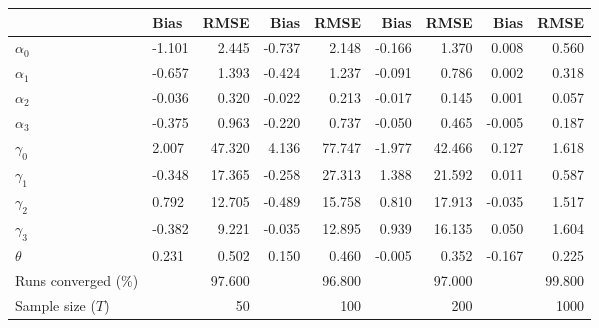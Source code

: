 
\begin{tabular}[t]{llrrrrrrr}
\toprule
  & Bias & RMSE & Bias & RMSE & Bias & RMSE & Bias & RMSE\\
\midrule
$\alpha_{0}$ & -1.101 & 2.445 & -0.737 & 2.148 & -0.166 & 1.370 & 0.008 & 0.560\\
$\alpha_{1}$ & -0.657 & 1.393 & -0.424 & 1.237 & -0.091 & 0.786 & 0.002 & 0.318\\
$\alpha_{2}$ & -0.036 & 0.320 & -0.022 & 0.213 & -0.017 & 0.145 & 0.001 & 0.057\\
$\alpha_{3}$ & -0.375 & 0.963 & -0.220 & 0.737 & -0.050 & 0.465 & -0.005 & 0.187\\
$\gamma_{0}$ & 2.007 & 47.320 & 4.136 & 77.747 & -1.977 & 42.466 & 0.127 & 1.618\\
$\gamma_{1}$ & -0.348 & 17.365 & -0.258 & 27.313 & 1.388 & 21.592 & 0.011 & 0.587\\
$\gamma_{2}$ & 0.792 & 12.705 & -0.489 & 15.758 & 0.810 & 17.913 & -0.035 & 1.517\\
$\gamma_{3}$ & -0.382 & 9.221 & -0.035 & 12.895 & 0.939 & 16.135 & 0.050 & 1.604\\
$\theta$ & 0.231 & 0.502 & 0.150 & 0.460 & -0.005 & 0.352 & -0.167 & 0.225\\
Runs converged (\%) &  & 97.600 &  & 96.800 &  & 97.000 &  & 99.800\\
Sample size ($T$) &  & 50 &  & 100 &  & 200 &  & 1000\\
\bottomrule
\end{tabular}
